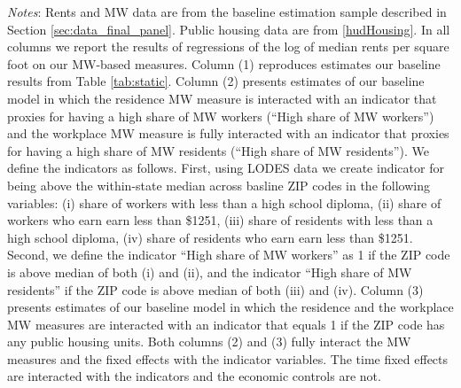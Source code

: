 \begin{table}[hbt!]
    \begin{minipage}{.95\textwidth} \footnotesize
        \vspace{2mm}
        \textit{Notes}: 
        Rents and MW data are from the baseline estimation sample described in Section 
        \ref{sec:data_final_panel}.
        Public housing data are from \ref{hudHousing}.
        In all columns we report the results of regressions of the log of median rents 
        per square foot on our MW-based measures.
        Column (1) reproduces estimates our baseline results from Table \ref{tab:static}.
        Column (2) presents estimates of our baseline model in which the residence MW 
        measure is interacted with an indicator that proxies for having a high share 
        of MW workers (``High share of MW workers'') and the workplace MW measure is 
        fully interacted with an indicator that proxies for having a high share of MW 
        residents (``High share of MW residents'').
        We define the indicators as follows.
        First, using LODES data we create indicator for being above the within-state 
        median across basline ZIP codes in the following variables: (i) share of workers 
        with less than a high school diploma, (ii) share of workers who earn earn less 
        than \$1251, (iii) share of residents with less than a high school diploma, (iv) 
        share of residents who earn earn less than \$1251.
        Second, we define the indicator ``High share of MW workers'' as 1 if the ZIP
        code is above median of both (i) and (ii), and the indicator ``High share of MW 
        residents'' if the ZIP code is above median of both (iii) and (iv).
        Column (3) presents estimates of our baseline model in which the residence and 
        the workplace MW measures are interacted with an indicator that equals 1 if 
        the ZIP code has any public housing units.
        Both columns (2) and (3) fully interact the MW measures and the fixed effects
        with the indicator variables.
        The time fixed effects are interacted with the indicators and the economic controls 
        are not.
    \end{minipage}
\end{table}
